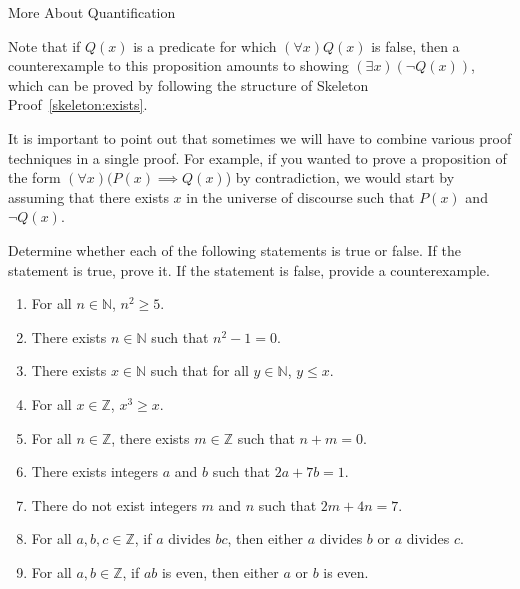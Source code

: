 \begin{section}{More About Quantification}
\begin{skeleton}
\begin{center}
\end{center}
\end{skeleton}

Note that if $Q(x)$ is a predicate for which $(\forall x)Q(x)$ is false, then a counterexample to this proposition amounts to showing $(\exists x)(\neg Q(x))$, which can be proved by following the structure of Skeleton Proof~\ref{skeleton:exists}.

It is important to point out that sometimes we will have to combine various proof techniques in a single proof.  For example, if you wanted to prove a proposition of the form $(\forall x)(P(x) \implies Q(x)$) by contradiction, we would start by assuming that there exists $x$ in the universe of discourse such that $P(x)$ and $\neg Q(x)$.

\begin{problem}
Determine whether each of the following statements is true or false. If the statement is true, prove it. If the statement is false, provide a counterexample.  
\begin{enumerate}[label=\textrm{(\alph*)}]
\item For all $n\in\mathbb{N}$, $n^2\geq 5$.
\item There exists $n \in \mathbb{N}$ such that $n^2-1=0$.
\item There exists $x \in \mathbb{N}$ such that for all $y \in \mathbb{N}$, $y \leq x$.
\item For all $x\in\mathbb{Z}$, $x^3\geq x$.
\item For all $n\in\mathbb{Z}$, there exists $m\in\mathbb{Z}$ such that $n+m=0$.
\item There exists integers $a$ and $b$ such that $2a+7b=1$.
\item There do not exist integers $m$ and $n$ such that $2m+4n=7$.
\item For all $a, b, c\in\mathbb{Z}$, if $a$ divides $bc$, then either $a$ divides $b$ or $a$ divides $c$.
\item For all $a, b\in\mathbb{Z}$, if $ab$ is even, then either $a$ or $b$ is even.
\end{enumerate}
\end{problem}


\end{section}
